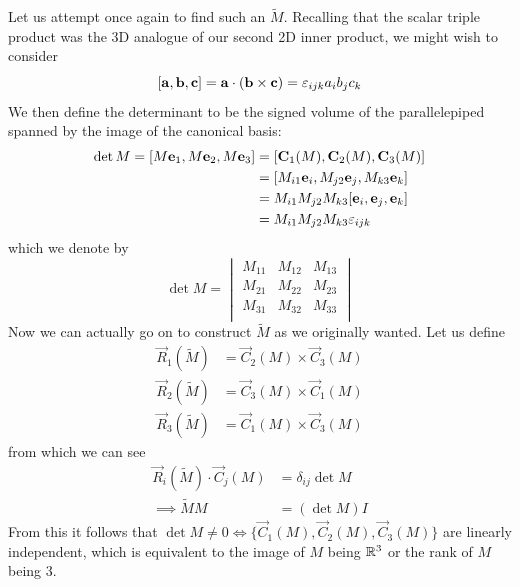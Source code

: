 \documentclass{../../template/note}
\begin{document}
    Let us attempt once again to find such an \(\tilde M\). Recalling that the scalar triple product was the 3D analogue of our second 2D inner product, we might wish to consider
    \[
        [\vec a, \vec b, \vec c] = \vec a \cdot (\vec b \times \vec c) = \lv{ijk}a_ib_jc_k
    \]
    We then define the determinant to be the signed volume of the parallelepiped spanned by the image of the canonical basis:
    \begin{align*}
        \det M = [M\vec e_1, M\vec e_2, M \vec e_3] &= [\vec C_1(M), \vec C_2(M), \vec C_3(M)] \\
        &= [M_{i1}\vec e_i, M_{j2}\vec e_j, M_{k3}\vec e_k] \\
        &= M_{i1}M_{j2}M_{k3} [\vec e_i, \vec e_j, \vec e_k] \\
        &= M_{i1}M_{j2}M_{k3} \lv{ijk}
    \end{align*}
    which we denote by
    \[
        \det M = \begin{vmatrix}
         M_{11} & M_{12} & M_{13} \\
         M_{21} & M_{22} & M_{23} \\
         M_{31} & M_{32} & M_{33} \\
        \end{vmatrix}
    \]
    Now we can actually go on to construct \(\tilde M\) as we originally wanted. Let us define
    \begin{align*}
        \vec R_1(\tilde M) &= \vec C_2 (M) \times \vec C_3 (M) \\
        \vec R_2(\tilde M) &= \vec C_3 (M) \times \vec C_1 (M) \\
        \vec R_3(\tilde M) &= \vec C_1 (M) \times \vec C_3 (M)
    \end{align*}
    from which we can see
    \begin{align*}
        \vec R_i(\tilde M) \cdot \vec C_j(M) &= \delta_{ij} \det M \\
        \implies \tilde MM &= (\det M) I
    \end{align*}
    From this it follows that \(\det M \neq 0 \iff \{\vec C_1(M), \vec C_2(M), \vec C_3(M)\}\) are linearly independent, which is equivalent to the image of \(M\) being \(\mathbb R^3\) or the rank of \(M\) being 3.
    
\end{document}
